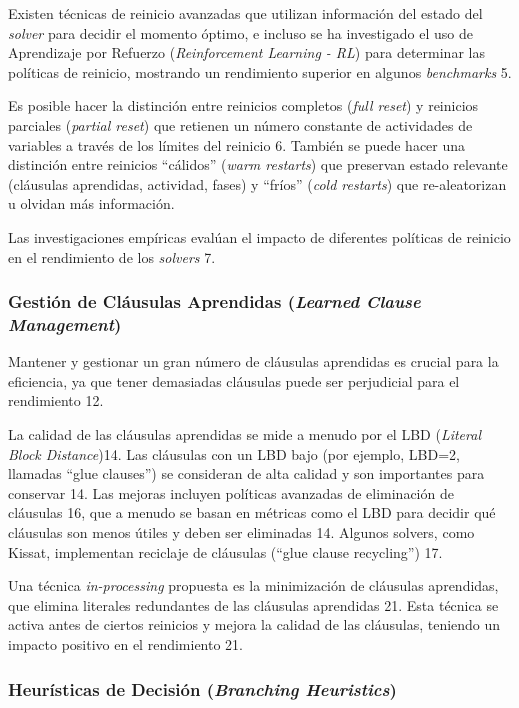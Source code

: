 Existen técnicas de reinicio avanzadas que utilizan información del estado del \textit{solver} para decidir el momento óptimo, e incluso se ha investigado el uso de Aprendizaje por Refuerzo (\textit{Reinforcement Learning - RL}) para determinar las políticas de reinicio, mostrando un rendimiento superior en algunos \textit{benchmarks} 5.

Es posible hacer la distinción entre reinicios completos (\textit{full reset}) y reinicios parciales (\textit{partial reset}) que retienen un número constante de actividades de variables a través de los límites del reinicio 6. También se puede hacer una distinción entre reinicios ``cálidos'' (\textit{warm restarts}) que preservan estado relevante (cláusulas aprendidas, actividad, fases) y ``fríos'' (\textit{cold restarts}) que re-aleatorizan u olvidan más información.

Las investigaciones empíricas evalúan el impacto de diferentes políticas de reinicio en el rendimiento de los \textit{solvers} 7.

\subsubsection{Gestión de Cláusulas Aprendidas (\textit{Learned Clause Management})}

Mantener y gestionar un gran número de cláusulas aprendidas es crucial para la eficiencia, ya que tener demasiadas cláusulas puede ser perjudicial para el rendimiento 12.

La calidad de las cláusulas aprendidas se mide a menudo por el LBD (\textit{Literal Block Distance})14. Las cláusulas con un LBD bajo (por ejemplo, LBD=2, llamadas ``glue clauses'') se consideran de alta calidad y son importantes para conservar 14. Las mejoras incluyen políticas avanzadas de eliminación de cláusulas 16, que a menudo se basan en métricas como el LBD para decidir qué cláusulas son menos útiles y deben ser eliminadas 14. Algunos solvers, como Kissat, implementan reciclaje de cláusulas (``glue clause recycling'') 17.

Una técnica \textit{in-processing} propuesta es la minimización de cláusulas aprendidas, que elimina literales redundantes de las cláusulas aprendidas 21. Esta técnica se activa antes de ciertos reinicios y mejora la calidad de las cláusulas, teniendo un impacto positivo en el rendimiento 21.

\subsubsection{Heurísticas de Decisión (\textit{Branching Heuristics})}

